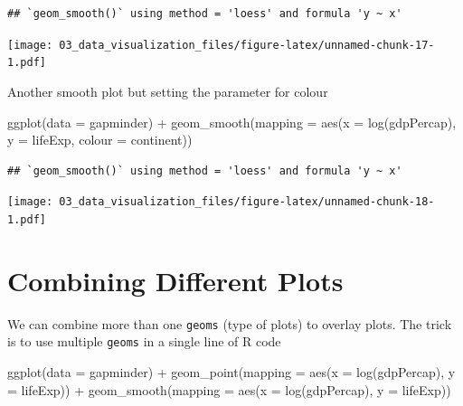 \documentclass[
  10pt,
]{krantz}
\newenvironment{Shaded}{\begin{snugshade}}{\end{snugshade}}
\newcommand{\AttributeTok}[1]{\textcolor[rgb]{0.77,0.63,0.00}{#1}}
\newcommand{\FunctionTok}[1]{\textcolor[rgb]{0.00,0.00,0.00}{#1}}
\newcommand{\NormalTok}[1]{#1}
\newcommand{\SpecialCharTok}[1]{\textcolor[rgb]{0.00,0.00,0.00}{#1}}
\begin{document}
\begin{verbatim}
## `geom_smooth()` using method = 'loess' and formula 'y ~ x'
\end{verbatim}

\texttt{[image: 03\_data\_visualization\_files/figure-latex/unnamed-chunk-17-1.pdf]}

Another smooth plot but setting the parameter for colour

\begin{Shaded}
\begin{Highlighting}[]
\FunctionTok{ggplot}\NormalTok{(}\AttributeTok{data =}\NormalTok{ gapminder) }\SpecialCharTok{+}
  \FunctionTok{geom\_smooth}\NormalTok{(}\AttributeTok{mapping =} \FunctionTok{aes}\NormalTok{(}\AttributeTok{x =} \FunctionTok{log}\NormalTok{(gdpPercap), }
                            \AttributeTok{y =}\NormalTok{ lifeExp, }
                            \AttributeTok{colour =}\NormalTok{ continent))}
\end{Highlighting}
\end{Shaded}

\begin{verbatim}
## `geom_smooth()` using method = 'loess' and formula 'y ~ x'
\end{verbatim}

\texttt{[image: 03\_data\_visualization\_files/figure-latex/unnamed-chunk-18-1.pdf]}

\hypertarget{combining-different-plots}{%
\section{Combining Different Plots}\label{combining-different-plots}}

We can combine more than one \texttt{geoms} (type of plots) to overlay plots. The trick is to use multiple \texttt{geoms} in a single line of R code

\begin{Shaded}
\begin{Highlighting}[]
\FunctionTok{ggplot}\NormalTok{(}\AttributeTok{data =}\NormalTok{ gapminder) }\SpecialCharTok{+}
  \FunctionTok{geom\_point}\NormalTok{(}\AttributeTok{mapping =} \FunctionTok{aes}\NormalTok{(}\AttributeTok{x =} \FunctionTok{log}\NormalTok{(gdpPercap), }\AttributeTok{y =}\NormalTok{ lifeExp)) }\SpecialCharTok{+}
  \FunctionTok{geom\_smooth}\NormalTok{(}\AttributeTok{mapping =} \FunctionTok{aes}\NormalTok{(}\AttributeTok{x =} \FunctionTok{log}\NormalTok{(gdpPercap), }\AttributeTok{y =}\NormalTok{ lifeExp))}
\end{Highlighting}
\end{Shaded}
\end{document}
